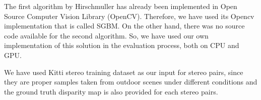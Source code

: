 \documentclass[dvips,letterpaper,12pt]{report}
\begin{document}
The first algorithm by Hirschmuller has already been implemented in Open Source Computer Vision Library (OpenCV). Therefore, we have used its Opencv implementation that is 
called SGBM. On the other hand, there was no source code available for the second algorithm. So, we have used our own implementation of this solution in the evaluation process, both on CPU and GPU.

We have used Kitti stereo training dataset as our input for stereo pairs, since they are proper samples taken from outdoor scenes under different conditions and the ground truth disparity map
is also provided for each stereo pairs.




 
\end{document}
